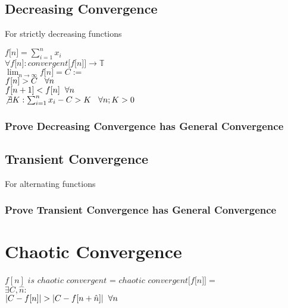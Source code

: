 \documentclass[11pt]{article}
\begin{document}
\subsection{Decreasing Convergence}
For strictly decreasing functions
\begin{center}
$ f \lbrack n \rbrack = \sum_{i=1}^{n} x_i$
\\ \vspace{2mm}
$\forall f \lbrack n \rbrack : convergent \lbrack f \lbrack n \rbrack \rbrack \rightarrow \mathbb{T}$
\\ \vspace{2mm}
$ \lim_{n \rightarrow \infty} f \lbrack n \rbrack = C:=$
\\ \vspace{2mm}
$f[n] > C \hspace{3mm} \forall n$
\\ \vspace{2mm}
$
f[n+1] < f[n] \hspace{2mm} \forall n
$
\\ \vspace{2mm}
$\not \exists K :\sum_{i=1}^{n} x_i - C > K \hspace{3mm} \forall n; K > 0$
\end{center}
\subsubsection{Prove Decreasing Convergence has General Convergence}




\subsection{Transient Convergence}
For alternating functions
\begin{center}

\end{center}
\subsubsection{Prove Transient Convergence has General Convergence}

\section{Chaotic Convergence}
\begin{center}
\vspace{1mm}
$f[n]$ $is$ $chaotic$ $convergent$ = $chaotic$ $convergent \lbrack f \lbrack n \rbrack \rbrack =$
\\ \vspace{4mm}
$
\exists C,\hat{n} :
$
\\ \vspace{2mm}
$
 |C - f[n]| > |C - f[n+\hat{n}]| \hspace{2mm} \forall n
$
\end{center}
\end{document}
